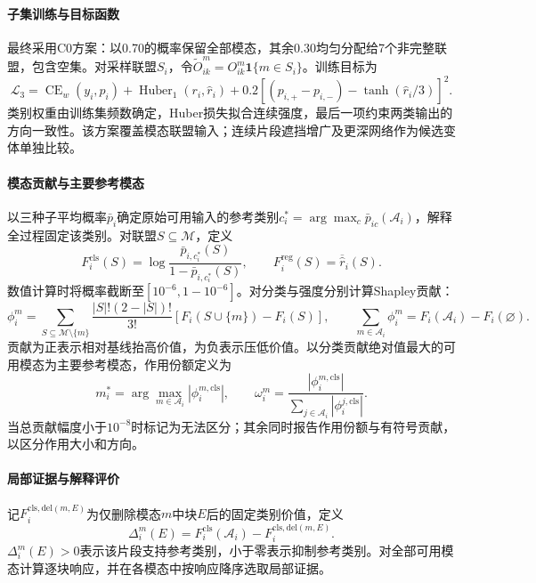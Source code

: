 \paragraph{子集训练与目标函数}
最终采用C0方案：以0.70的概率保留全部模态，其余0.30均匀分配给7个非完整联盟，包含空集。对采样联盟$S_i$，令$\widetilde O^m_{ik}=O^m_{ik}\mathbf1\{m\in S_i\}$。训练目标为
\begin{equation}
\mathcal L_3=\operatorname{CE}_w(y_i,p_i)+\operatorname{Huber}_1(r_i,\widehat r_i)
+0.2\left[(p_{i,+}-p_{i,-})-\tanh(\widehat r_i/3)\right]^2.
\end{equation}
类别权重由训练集频数确定，Huber损失拟合连续强度，最后一项约束两类输出的方向一致性。该方案覆盖模态联盟输入；连续片段遮挡增广及更深网络作为候选变体单独比较。

\paragraph{模态贡献与主要参考模态}
以三种子平均概率$\bar p_i$确定原始可用输入的参考类别$c_i^*=\arg\max_c\bar p_{ic}(\mathcal A_i)$，解释全过程固定该类别。对联盟$S\subseteq\mathcal M$，定义
\begin{equation}
F_i^{\mathrm{cls}}(S)=\log\frac{\bar p_{i,c_i^*}(S)}{1-\bar p_{i,c_i^*}(S)},\qquad
F_i^{\mathrm{reg}}(S)=\overline{\widehat r}_i(S).
\end{equation}
数值计算时将概率截断至$[10^{-6},1-10^{-6}]$。对分类与强度分别计算Shapley贡献：
\begin{equation}
\phi_i^m=\sum_{S\subseteq\mathcal M\setminus\{m\}}\frac{|S|!(2-|S|)!}{3!}
\left[F_i(S\cup\{m\})-F_i(S)\right],\qquad
\sum_{m\in\mathcal A_i}\phi_i^m=F_i(\mathcal A_i)-F_i(\varnothing).
\end{equation}
贡献为正表示相对基线抬高价值，为负表示压低价值。以分类贡献绝对值最大的可用模态为主要参考模态，作用份额定义为
\begin{equation}
m_i^*=\arg\max_{m\in\mathcal A_i}|\phi_i^{m,\mathrm{cls}}|,\qquad
\omega_i^m=\frac{|\phi_i^{m,\mathrm{cls}}|}{\sum_{j\in\mathcal A_i}|\phi_i^{j,\mathrm{cls}}|}.
\end{equation}
当总贡献幅度小于$10^{-8}$时标记为无法区分；其余同时报告作用份额与有符号贡献，以区分作用大小和方向。

\paragraph{局部证据与解释评价}
记$F_i^{\mathrm{cls,del}(m,E)}$为仅删除模态$m$中块$E$后的固定类别价值，定义
\begin{equation}
\Delta_i^m(E)=F_i^{\mathrm{cls}}(\mathcal A_i)-F_i^{\mathrm{cls,del}(m,E)}.
\end{equation}
$\Delta_i^m(E)>0$表示该片段支持参考类别，小于零表示抑制参考类别。对全部可用模态计算逐块响应，并在各模态中按响应降序选取局部证据。

